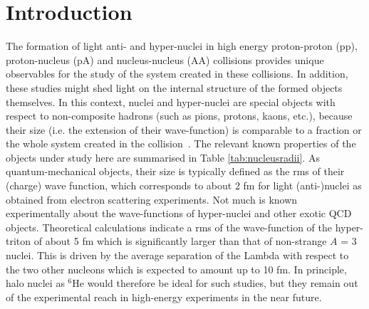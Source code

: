 \documentclass[a4paper,11pt]{scrartcl} %
\begin{document}
\section{Introduction} 
The formation of light anti- and hyper-nuclei in high energy proton-proton (pp), proton-nucleus (pA) and nucleus-nucleus (AA) collisions provides unique observables for the study of the system created in these collisions. In addition, these studies might shed light on the internal structure of the formed objects themselves. 
In this context, nuclei and hyper-nuclei are special objects with respect to non-composite hadrons (such as pions, protons, kaons, etc.), because their size (i.e. the extension of their wave-function) is comparable to a fraction or the whole system created in the collision~\cite{Adam:2015vna}.  
The relevant known properties of the objects under study here are summarised in Table \ref{tab:nucleusradii}.
As quantum-mechanical objects, their size is typically defined as the rms of their (charge) wave function, which corresponds to about 2 fm for light (anti-)nuclei as obtained from electron scattering experiments. Not much is known experimentally about the wave-functions of hyper-nuclei and other exotic QCD objects. Theoretical calculations indicate a rms of the wave-function of the hyper-triton of about 5 fm which is significantly larger than that of non-strange $A$ = 3 nuclei. This is driven by the average separation of the Lambda with respect to the two other nucleons which is expected to amount up to 10 fm. In principle, halo nuclei as $^{6}$He would therefore be ideal for such studies, but they remain out of the experimental reach in high-energy experiments in the near future.
\end{document}
